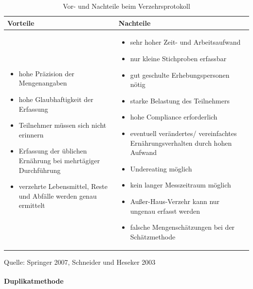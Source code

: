 \begin{table}[!h]
\begin{flushleft}
\caption{Vor- und Nachteile beim Verzehrsprotokoll}
\end{flushleft}
\begin{tabular}{p{7cm} p{7cm}}
Vorteile & Nachteile \\
\hline

\begin{itemize}
\item hohe Präzision der Mengenangaben
\item hohe Glaubhaftigkeit der Erfassung
\item Teilnehmer müssen sich nicht erinnern
\item Erfassung der üblichen Ernährung bei mehrtägiger Durchführung
\item verzehrte Lebensmittel, Reste und Abfälle werden genau ermittelt


\end{itemize}

&

\begin{itemize}
\item sehr hoher Zeit- und Arbeitsaufwand
\item nur kleine Stichproben erfassbar
\item gut geschulte Erhebungspersonen nötig
\item starke Belastung des Teilnehmers
\item hohe Compliance erforderlich
\item eventuell verändertes/ vereinfachtes Ernährungsverhalten durch hohen Aufwand
\item Undereating möglich
\item kein langer Messzeitraum möglich
\item Außer-Haus-Verzehr kann nur ungenau erfasst werden
\item falsche Mengenschätzungen bei der Schätzmethode

\end{itemize}
\end{tabular}
\label{tab:Verzehrsprotokoll}
Quelle: Springer 2007, Schneider und Heseker 2003
\end{table}



\paragraph{Duplikatmethode}

